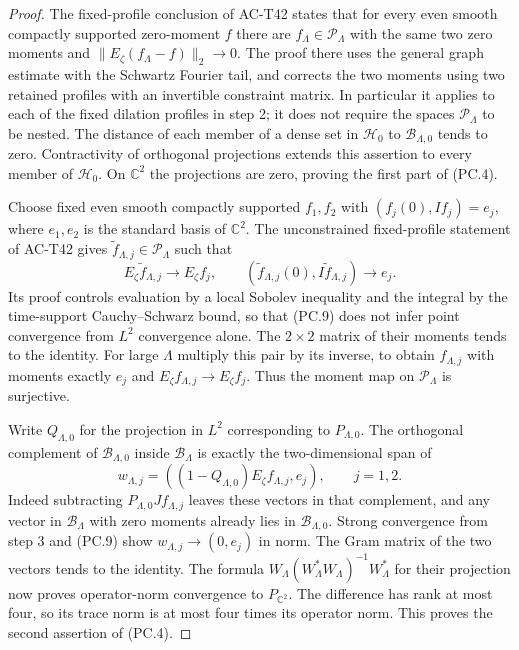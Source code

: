 \begin{proof}
The fixed-profile conclusion of AC-T42 states that for every
even smooth compactly supported zero-moment $f$ there are
$f_\Lambda\in\mathcal P_\Lambda$ with the same two zero
moments and
$\|E_\zeta(f_\Lambda-f)\|_2\to0$.
The proof there uses the general graph estimate with the
Schwartz Fourier tail, and corrects the two moments using
two retained profiles with an invertible constraint matrix.
In particular it applies to each of the fixed dilation
profiles in step 2; it does not require the spaces
$\mathcal P_\Lambda$ to be nested.
The distance of each member of a dense set in
$\mathcal H_0$ to $\mathcal B_{\Lambda,0}$ tends to zero.
Contractivity of orthogonal projections extends this
assertion to every member of $\mathcal H_0$.
On $\mathbb C^2$ the projections are zero, proving the
first part of (PC.4).

Choose fixed even smooth compactly supported $f_1,f_2$
with $(f_j(0),If_j)=e_j$, where $e_1,e_2$ is the standard
basis of $\mathbb C^2$.
The unconstrained fixed-profile statement of AC-T42 gives
$\widetilde f_{\Lambda,j}\in\mathcal P_\Lambda$ such that
\[
 E_\zeta\widetilde f_{\Lambda,j}\to E_\zeta f_j,
 \qquad
 (\widetilde f_{\Lambda,j}(0),I\widetilde f_{\Lambda,j})
                         \to e_j.
 \tag{PC.9}
\]
Its proof controls evaluation by a local Sobolev inequality
and the integral by the time-support Cauchy--Schwarz bound,
so that (PC.9) does not infer point convergence from
$L^2$ convergence alone.
The $2\times2$ matrix of their moments tends to the identity.
For large $\Lambda$ multiply this pair by its inverse, to
obtain $f_{\Lambda,j}$ with moments exactly $e_j$ and
$E_\zeta f_{\Lambda,j}\to E_\zeta f_j$.
Thus the moment map on $\mathcal P_\Lambda$ is surjective.

Write $Q_{\Lambda,0}$ for the projection in $L^2$ corresponding
to $P_{\Lambda,0}$.  The orthogonal complement of
$\mathcal B_{\Lambda,0}$ inside $\mathcal B_\Lambda$ is
exactly the two-dimensional span of
\[
 w_{\Lambda,j}
   =((1-Q_{\Lambda,0})E_\zeta f_{\Lambda,j},e_j),
                              \qquad j=1,2.
 \tag{PC.10}
\]
Indeed subtracting $P_{\Lambda,0}Jf_{\Lambda,j}$ leaves
these vectors in that complement, and any vector in
$\mathcal B_\Lambda$ with zero moments already lies in
$\mathcal B_{\Lambda,0}$.
Strong convergence from step 3 and (PC.9) show
$w_{\Lambda,j}\to(0,e_j)$ in norm.
The Gram matrix of the two vectors tends to the identity.
The formula $W_\Lambda(W_\Lambda^*W_\Lambda)^{-1}W_\Lambda^*$
for their projection now proves operator-norm convergence
to $P_{\mathbb C^2}$.  The difference has rank at most four,
so its trace norm is at most four times its operator norm.
This proves the second assertion of (PC.4).


\end{proof}
